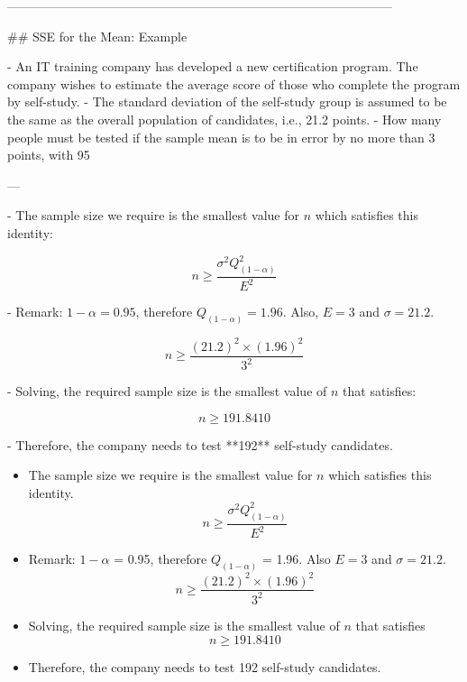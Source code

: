 --------------------------------------------------------------------------------------------

## SSE for the Mean: Example

- An IT training company has developed a new certification program. The company wishes to estimate the average score of those who complete the program by self-study.
- The standard deviation of the self-study group is assumed to be the same as the overall population of candidates, i.e., 21.2 points.
- How many people must be tested if the sample mean is to be in error by no more than 3 points, with 95%

---

- The sample size we require is the smallest value for \( n \) which satisfies this identity:
  

\[
  n \geq \frac{\sigma^2 Q^2_{(1-\alpha)}}{E^2}
  \]


- Remark: \( 1-\alpha = 0.95 \), therefore \( Q_{(1-\alpha)} = 1.96 \). Also, \( E = 3 \) and \( \sigma = 21.2 \).
  

\[
  n \geq \frac{(21.2)^2 \times (1.96)^2}{3^2}
  \]


- Solving, the required sample size is the smallest value of \( n \) that satisfies:
  

\[
  n \geq 191.8410
  \]


- Therefore, the company needs to test **192** self-study candidates.






\begin{itemize}
\item The sample size we require is the smallest value for $n$ which satisfies this identity.
\[ n \geq \frac{\sigma^2 Q^2_{(1-\alpha)}}{E^2}  \]
\item Remark: $1-\alpha$ = 0.95, therefore $Q_{(1-\alpha)}$ = 1.96. Also $E=3$ and $\sigma =21.2$.
\[ n \geq \frac{(21.2)^2 \times (1.96)^2}{3^2} \]
\item Solving, the required sample size is the smallest value of $n$ that satisfies
\[ n \geq 191.8410 \]
\item Therefore, the company needs to test 192 self-study candidates.
\end{itemize}





